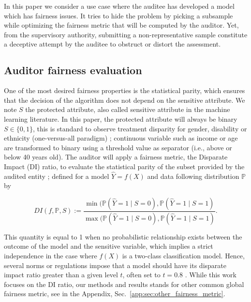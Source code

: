 \documentclass[runningheads, orivec]{llncs}
\begin{document}
In this paper we consider a use case where the auditee has developed a model which has fairness issues. It tries to hide the problem by picking a subsample while optimizing the fairness metric that will be computed by the auditor. Yet, from the supervisory authority, submitting a non-representative sample constitute a deceptive attempt by the auditee to obstruct or distort the assessment.

\subsection{Auditor fairness evaluation}

One of the most desired fairness properties is the statistical parity, which ensures that the decision of the algorithm does not depend on the sensitive attribute. We note $S$ the protected attribute, also called sensitive attribute in the machine learning literature. In this paper, the protected attribute will always be binary \\ $S\in\{0,1\}$, this is standard to observe treatment disparity for gender, disability or ethnicity (one-versus-all paradigm) ; continuous variable such as income or age are transformed to binary using a threshold value as separator (i.e., above or below 40 years old).  The auditor will apply a fairness metric, the Disparate Impact (DI) ratio, to evaluate the statistical parity of the subset provided by the audited entity ; defined for a model $\widehat{Y}=f(X)$ and data following distribution $\mathbb{P}$ by 

\begin{equation}
    \label{DI}
    DI(f,\mathbb{P}, S):= \frac{\min(\mathbb{P}(\widehat{Y} = 1 \mid S = 0), \mathbb{P}(\widehat{Y} = 1 \mid S = 1)}{\max(\mathbb{P}(\widehat{Y} = 1 \mid S = 0), \mathbb{P}(\widehat{Y} = 1 \mid S = 1)}.
\end{equation}

This quantity is equal to 1 when no probabilistic relationship exists between the outcome of the model and the sensitive variable, which implies a strict independence in the case where $f(X)$ is a two-class classification model. %
Hence, several norms or regulations impose that a model should have its disparate impact ratio greater than a given level $t$, often set to $t=0.8$ \cite{Uni_guidelines, feldman2015certifying, wright2024null}. %
While this work focuses on the DI ratio, our methods and results stands for other common global fairness metric, see in the Appendix, Sec.~\ref{app:sec:other_fairness_metric}.
\end{document}
